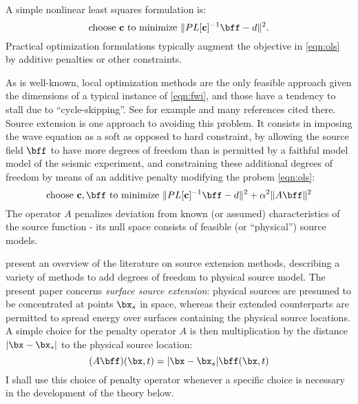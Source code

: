 A simple nonlinear least squares formulation is:
\begin{equation}
\label{eqn:ols}
\mbox{choose } {\bf c} \mbox{ to minimize } \|PL[{\bf c}]^{-1}\bff -d \|^2.
\end{equation}
Practical optimization formulations typically augment the objective in
\ref{eqn:ols} by additive penalties or other constraints.

As is well-known, local optimization methods are the only feasible
approach given the dimensions of a typical instance of \ref{eqn:fwi},
and those have a tendency to stall due to ``cycle-skipping''. See for
example \cite{VirieuxOperto:09} and many references cited there. Source
extension is one approach to avoiding this problem. It consists in
imposing the wave equation as a soft as opposed to hard constraint, by
allowing the source field $\bff$ to have more degrees of freedom than
is permitted by a faithful model model of the seismic experiment, and
constraining these additional degrees of freedom by means of an
additive penalty modifying the probem \ref{eqn:ols}:
\begin{equation}
\label{eqn:esi}
\mbox{choose } {\bf c}, \bff \mbox{ to minimize } \|PL[{\bf c}]^{-1}\bff -d \|^2 + \alpha^2 \|A\bff\|^2 
\end{equation}
The operator $A$ penalizes deviation from known (or assumed)
characteristics of the source function - its null space consists of
feasible (or ``physical'') source models.

\cite{HuangNammourSymesDollizal:SEG19} present an overview of the
literature on source extension methods, describing a variety of
methods to add degrees of freedom to physical source model. The present paper
concerns {\em surface source extension}: physical sources are
presumed to be concentrated at points $\bx_s$ in space, whereas their extended
counterparts are permitted to spread energy over surfaces containing
the physical source locations. A simple choice for the penalty
operator $A$ is then multiplication by the distance $|\bx-\bx_s|$ to the physical
source location:
\begin{equation}
  \label{eqn:penop}
  (A\bff)(\bx,t) = |\bx-\bx_s|\bff(\bx,t)
\end{equation}
I shall use this choice of penalty operator whenever a specific choice
is necessary in the development of the theory below.

